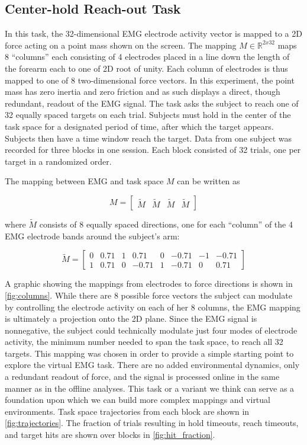 \documentclass[
  a4paper,
]{article}
\begin{document}
\hypertarget{center-hold-reach-out-task}{%
\subsection{Center-hold Reach-out
Task}\label{center-hold-reach-out-task}}

In this task, the 32-dimensional EMG electrode activity vector is mapped
to a 2D force acting on a point mass shown on the screen. The mapping
\(M\in\mathbb{R}^{2x32}\) maps 8 ``columns'' each consisting of 4
electrodes placed in a line down the length of the forearm each to one
of 2D root of unity. Each column of electrodes is thus mapped to one of
8 two-dimensional force vectors. In this experiment, the point mass has
zero inertia and zero friction and as such displays a direct, though
redundant, readout of the EMG signal. The task asks the subject to reach
one of 32 equally spaced targets on each trial. Subjects must hold in
the center of the task space for a designated period of time, after
which the target appears. Subjects then have a time window reach the
target. Data from one subject was recorded for three blocks in one
session. Each block consisted of 32 trials, one per target in a
randomized order.

The mapping between EMG and task space \(M\) can be written as

\[
M = \begin{bmatrix}\tilde{M} & \tilde{M} & \tilde{M} & \tilde{M}\end{bmatrix}
\]

where \(\tilde{M}\) consists of 8 equally spaced directions, one for
each ``column'' of the 4 EMG electrode bands around the subject's arm:

\[
\tilde{M} =
\begin{bmatrix}
0  & 0.71  & 1   & 0.71   & 0  & -0.71  & -1  & -0.71 \\
1  & 0.71  & 0  & -0.71  & 1   & -0.71   & 0   & 0.71
\end{bmatrix}
\]

A graphic showing the mappings from electrodes to force directions is
shown in \cref{fig:columns}. While there are 8 possible force vectors
the subject can modulate by controlling the electrode activity on each
of her 8 columns, the EMG mapping is ultimately a projection onto the 2D
plane. Since the EMG signal is nonnegative, the subject could
technically modulate just four modes of electrode activity, the minimum
number needed to span the task space, to reach all 32 targets. This
mapping was chosen in order to provide a simple starting point to
explore the virtual EMG task. There are no added environmental dynamics,
only a redundant readout of force, and the signal is processed online in
the same manner as in the offline analyses. This task or a variant we
think can serve as a foundation upon which we can build more complex
mappings and virtual environments. Task space trajectories from each
block are shown in \cref{fig:trajectories}. The fraction of trials
resulting in hold timeouts, reach timeouts, and target hits are shown
over blocks in \cref{fig:hit_fraction}.
\end{document}
